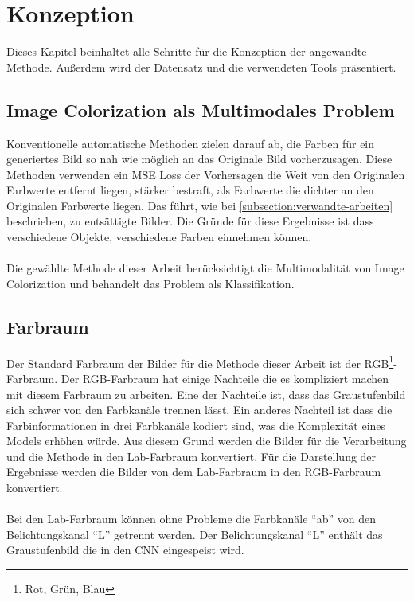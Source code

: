 \chapter{Konzeption}
Dieses Kapitel beinhaltet alle Schritte für die Konzeption der angewandte Methode. Außerdem wird der Datensatz und die verwendeten Tools 
präsentiert.

\section{Image Colorization als Multimodales Problem}
Konventionelle automatische Methoden zielen darauf ab, die Farben für ein generiertes Bild so nah wie möglich an das Originale Bild vorherzusagen.
Diese Methoden verwenden ein MSE Loss der Vorhersagen die Weit von den Originalen Farbwerte entfernt liegen, stärker bestraft, als Farbwerte
die dichter an den Originalen Farbwerte liegen. Das führt, wie bei \ref{subsection:verwandte-arbeiten} beschrieben, zu entsättigte Bilder.
Die Gründe für diese Ergebnisse ist dass verschiedene Objekte, verschiedene Farben einnehmen können. 
\\
\\
Die gewählte Methode dieser Arbeit berücksichtigt die Multimodalität von Image Colorization und behandelt das Problem als Klassifikation.

\section{Farbraum}
Der Standard Farbraum der Bilder für die Methode dieser Arbeit ist der RGB\footnote{Rot, Grün, Blau}-Farbraum. Der RGB-Farbraum hat einige Nachteile die es kompliziert
machen mit diesem Farbraum zu arbeiten. Eine der Nachteile ist, dass das Graustufenbild sich schwer von den Farbkanäle trennen lässt. Ein anderes
Nachteil ist dass die Farbinformationen in drei Farbkanäle kodiert sind, was die Komplexität eines Models erhöhen würde. Aus diesem Grund
werden die Bilder für die Verarbeitung und die Methode in den Lab-Farbraum konvertiert. Für die Darstellung der Ergebnisse werden die Bilder
von dem Lab-Farbraum in den RGB-Farbraum konvertiert.
\\
\\
Bei den Lab-Farbraum können ohne Probleme die Farbkanäle ``ab'' von den Belichtungskanal ``L'' getrennt werden. Der Belichtungskanal ``L'' 
enthält das Graustufenbild die in den CNN eingespeist wird.

